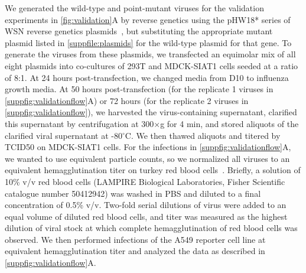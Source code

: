 \documentclass[10pt,letterpaper]{article}
\newcommand{\FIG}[1]{\autoref{fig:#1}}
\newcommand{\SUPPFILE}[1]{\autoref{suppfile:#1}}
\newcommand{\SUPPFIG}[1]{\autoref{suppfig:#1}}
\begin{document}
We generated the wild-type and point-mutant viruses for the validation experiments in \FIG{validation}A by reverse genetics using the pHW18* series of WSN reverse genetics plasmids~\citep{hoffmann2000dna}, but substituting the appropriate mutant plasmid listed in \SUPPFILE{plasmids} for the wild-type plasmid for that gene.
To generate the viruses from these plasmids, we transfected an equimolar mix of all eight plasmids into co-cultures of 293T and MDCK-SIAT1 cells seeded at a ratio of 8:1.
At 24 hours post-transfection, we changed media from D10 to influenza growth media. 
At 50 hours post-transfection (for the replicate 1 viruses in \SUPPFIG{validationflow}A) or 72 hours (for the replicate 2 viruses in \SUPPFIG{validationflow}), we harvested the virus-containing supernatant, clarified this supernatant by centrifugation at 300$\times$g for 4 min, and stored aliquots of the clarified viral supernatant at -80$^{\circ}$C.
We then thawed aliquots and titered by TCID50 on MDCK-SIAT1 cells.
For the infections in \SUPPFIG{validationflow}A, we wanted to use equivalent particle counts, so we normalized all viruses to an equivalent hemagglutination titer on turkey red blood cells~\citep{hirst1942quantitative}.
 Briefly, a solution of 10\% v/v red blood cells (LAMPIRE Biological Laboratories, Fisher Scientific catalogue number 50412942)  was washed in PBS and diluted to a final concentration of 0.5\% v/v. 
Two-fold serial dilutions of virus were added to an equal volume of diluted red blood cells, and titer was measured as the highest dilution of viral stock at which complete hemagglutination of red blood cells was observed.
We then performed infections of the A549 reporter cell line at equivalent hemagglutination titer and analyzed the data as described in \SUPPFIG{validationflow}A. 
\end{document}
